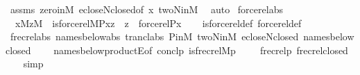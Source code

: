 \begin{isabellebody}
\ assms\ zero{\isacharunderscore}{\kern0pt}in{\isacharunderscore}{\kern0pt}M\ ecloseN{\isacharunderscore}{\kern0pt}closed{\isacharbrackleft}{\kern0pt}of\ x{\isacharbrackright}{\kern0pt}\ twoN{\isacharunderscore}{\kern0pt}in{\isacharunderscore}{\kern0pt}M\ \isamarkupfalse%
\ auto%
\endisatagproof
{\isafoldproof}%
%
\isadelimproof
\isanewline
%
\endisadelimproof
\isanewline
{}\isamarkupfalse%
\ forcerel{\isacharunderscore}{\kern0pt}abs\ {\isacharcolon}{\kern0pt}\isanewline
\ \ {\isachardoublequoteopen}{\isasymlbrakk}x{\isasymin}M{\isacharsemicolon}{\kern0pt}z{\isasymin}M{\isasymrbrakk}\ {\isasymLongrightarrow}\ is{\isacharunderscore}{\kern0pt}forcerel{\isacharparenleft}{\kern0pt}{\isacharhash}{\kern0pt}{\isacharhash}{\kern0pt}M{\isacharcomma}{\kern0pt}P{\isacharcomma}{\kern0pt}x{\isacharcomma}{\kern0pt}z{\isacharparenright}{\kern0pt}\ {\isasymlongleftrightarrow}\ z\ {\isacharequal}{\kern0pt}\ forcerel{\isacharparenleft}{\kern0pt}P{\isacharcomma}{\kern0pt}x{\isacharparenright}{\kern0pt}{\isachardoublequoteclose}\isanewline
%
\isadelimproof
\ \ %
\endisadelimproof
%
\isatagproof
{}\isamarkupfalse%
\ is{\isacharunderscore}{\kern0pt}forcerel{\isacharunderscore}{\kern0pt}def\ forcerel{\isacharunderscore}{\kern0pt}def\isanewline
\ \ \isamarkupfalse%
\ frecrel{\isacharunderscore}{\kern0pt}abs\ names{\isacharunderscore}{\kern0pt}below{\isacharunderscore}{\kern0pt}abs\ trancl{\isacharunderscore}{\kern0pt}abs\ P{\isacharunderscore}{\kern0pt}in{\isacharunderscore}{\kern0pt}M\ twoN{\isacharunderscore}{\kern0pt}in{\isacharunderscore}{\kern0pt}M\ ecloseN{\isacharunderscore}{\kern0pt}closed\ names{\isacharunderscore}{\kern0pt}below{\isacharunderscore}{\kern0pt}closed\isanewline
\ \ \ \ names{\isacharunderscore}{\kern0pt}below{\isacharunderscore}{\kern0pt}productE{\isacharbrackleft}{\kern0pt}of\ concl{\isacharcolon}{\kern0pt}{\isachardoublequoteopen}{\isasymlambda}p{\isachardot}{\kern0pt}\ is{\isacharunderscore}{\kern0pt}frecrel{\isacharparenleft}{\kern0pt}{\isacharhash}{\kern0pt}{\isacharhash}{\kern0pt}M{\isacharcomma}{\kern0pt}p{\isacharcomma}{\kern0pt}{\isacharunderscore}{\kern0pt}{\isacharparenright}{\kern0pt}\ {\isasymlongleftrightarrow}\ \ {\isacharunderscore}{\kern0pt}\ {\isacharequal}{\kern0pt}\ frecrel{\isacharparenleft}{\kern0pt}p{\isacharparenright}{\kern0pt}{\isachardoublequoteclose}{\isacharbrackright}{\kern0pt}\ frecrel{\isacharunderscore}{\kern0pt}closed\isanewline
\ \ \isamarkupfalse%
\ simp%
\endisatagproof
{\isafoldproof}%
%
\isadelimproof
\isanewline
%
\endisadelimproof

\end{isabellebody}
